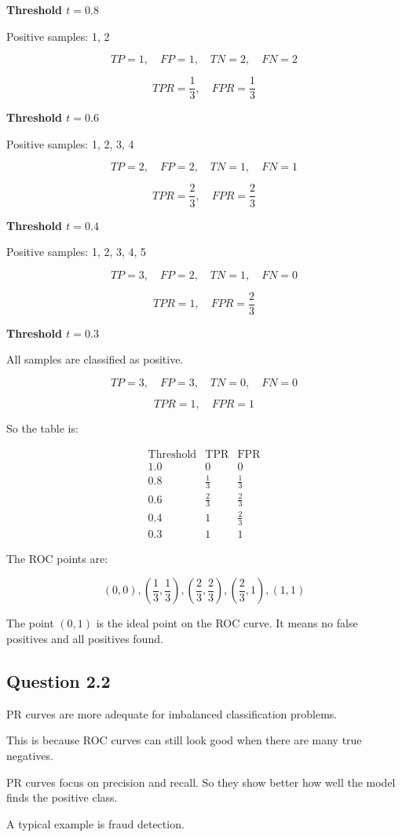 \documentclass[paper=a4, fontsize=11pt]{scrartcl}
\begin{document}
\textbf{Threshold $t=0.8$}

Positive samples: 1, 2

\[
TP=1,\quad FP=1,\quad TN=2,\quad FN=2
\]

\[
TPR=\frac{1}{3},\quad FPR=\frac{1}{3}
\]

\textbf{Threshold $t=0.6$}

Positive samples: 1, 2, 3, 4

\[
TP=2,\quad FP=2,\quad TN=1,\quad FN=1
\]

\[
TPR=\frac{2}{3},\quad FPR=\frac{2}{3}
\]

\textbf{Threshold $t=0.4$}

Positive samples: 1, 2, 3, 4, 5

\[
TP=3,\quad FP=2,\quad TN=1,\quad FN=0
\]

\[
TPR=1,\quad FPR=\frac{2}{3}
\]

\textbf{Threshold $t=0.3$}

All samples are classified as positive.

\[
TP=3,\quad FP=3,\quad TN=0,\quad FN=0
\]

\[
TPR=1,\quad FPR=1
\]

So the table is:

\[
\begin{array}{c|c|c}
\text{Threshold} & \text{TPR} & \text{FPR} \\
\hline
1.0 & 0 & 0 \\
0.8 & \frac{1}{3} & \frac{1}{3} \\
0.6 & \frac{2}{3} & \frac{2}{3} \\
0.4 & 1 & \frac{2}{3} \\
0.3 & 1 & 1
\end{array}
\]

The ROC points are:

\[
(0,0),\left(\frac{1}{3},\frac{1}{3}\right),\left(\frac{2}{3},\frac{2}{3}\right),\left(\frac{2}{3},1\right),(1,1)
\]

The point $(0,1)$ is the ideal point on the ROC curve.  
It means no false positives and all positives found.

\subsection*{Question 2.2}
PR curves are more adequate for imbalanced classification problems.

This is because ROC curves can still look good when there are many true negatives.

PR curves focus on precision and recall.  
So they show better how well the model finds the positive class.

A typical example is fraud detection.
\end{document}
